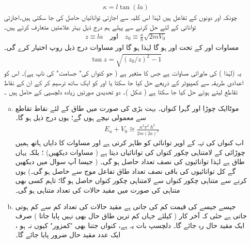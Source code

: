 \begin{align}\label{مساوات_شروڈنگر_حل_کپا}
\kappa =l\tan(la) 
 \end{align}
 چونکہ   اور  دونوں  کے تفاعل ہیں لہٰذا   اس  کلیہ سے  اجازتی توانائیاں  حاصل کی جا سکتی  ہیں۔اجازتی توانائی  کے لئے حل کرنے سے پہلے ہم درج ذیل  بہتر علامتیں متعارف کرتے ہیں۔
\begin{align}
z\equiv l a \quad \text{اور}\quad z_0\equiv\frac{a}{\hslash}\sqrt{2mV_0}
\end{align} 
مساوات   اور  کے تحت  اور ہو گا لہٰذا   ہو گا اور مساوات    درج ذیل  روپ اختیار کرے گی۔
\begin{align}
\tan z=\sqrt{(z_{0}/z)^{2}-1} 
\end{align}
 یہ   (لہٰذا  )  کی ماورائی مساوات ہے جس کا متغیر  ہے ( جو کنواں کی" جسامت" کی  ناپ ہے)۔  اس کو اعدادی طریقہ سے کمپیوٹر کے ذریعے حل کیا جا سکتا یا  اور  کو ایک ساتھ  ترسیم کر کے  ان کے نقاط تقاطع  لیتے ہوئے  حل کیا جا سکتا ہے ( شکل )۔    دو تحدیدی صورتیں زیادہ دلچسپی کے حامل ہیں ۔ 
\begin{enumerate}[a.]
\item
 موٹا{ایک چوڑا اور  گہرا کنواں۔}\quad
 بہت بڑی    کی صورت میں   طاق  کے لئے  نقاط تقاطع      سے  معمولی   نیچے ہوں گے؛   یوں درج ذیل  ہو گا۔
\begin{align}
E_{n}+V_{0}\cong \frac{n^{2}\pi^{2}\hslash^{2}}{2m(2a)^{2}}
 \end{align}
اب کنواں کی تہہ کے  اوپر توانائی کو ظاہر کرتی ہے اور مساوات کا دایاں ہاتھ  ہمیں  چوڑائی کے لامتناہی چکور  کنواں کی توانائیاں دیتا ہے  ( مساوات  دیکھیں) ؛  بلکہ    یہاں طاق ہے لہٰذا     توانائیوں کی نصف تعداد   حاصل ہو گی۔ ( جیسا آپ سوال    میں دیکھیں گے کل توانائیوں کی باقی نصف تعداد  طاق  تفاعل موج سے حاصل ہو گی۔)    یوں کرنے سے متناہی چکور  کنواں سے لامتناہی چکور  کنواں حاصل ہو گا؛  تاہم  کسی بھی متناہی  کی صورت میں مقید حالات کی تعداد متناہی ہو گی۔ 
\item 
{}\quad 
 جیسے جیسے  کی قیمت کم کی جاتی  ہے مقید حالات کی تعداد کم سے کم ہوتی جاتی ہے  حتٰی  کہ آخر کار ( کیلئے جہاں کم ترین  طاق  حال  بھی نہیں پایا جاتا )  صرف ایک  مقید حال رہ جائے گا۔    دلچسپ بات یہ ہے،  کنواں  جتنا   بھی  "کمزور"     کیوں نہ ہو ،   ایک عدد مقید حال ضرور   پایا جائے گا۔
\end{enumerate}


